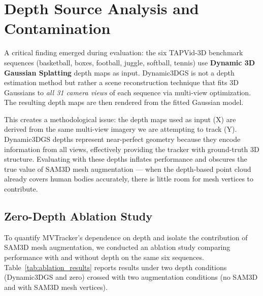 \documentclass[12pt, a4paper, oneside]{report}
\begin{document}
\section{Depth Source Analysis and Contamination}
\label{sec:depth_contamination}

A critical finding emerged during evaluation: the six TAPVid-3D benchmark sequences (basketball, boxes, football, juggle, softball, tennis) use \textbf{Dynamic 3D Gaussian Splatting} \cite{luiten2023dynamic} depth maps as input. Dynamic3DGS is not a depth estimation method but rather a scene reconstruction technique that fits 3D Gaussians to \emph{all 31 camera views} of each sequence via multi-view optimization. The resulting depth maps are then rendered from the fitted Gaussian model.

This creates a methodological issue: the depth maps used as input (X) are derived from the same multi-view imagery we are attempting to track (Y). Dynamic3DGS depths represent near-perfect geometry because they encode information from all views, effectively providing the tracker with ground-truth 3D structure. Evaluating with these depths inflates performance and obscures the true value of SAM3D mesh augmentation --- when the depth-based point cloud already covers human bodies accurately, there is little room for mesh vertices to contribute.

\subsection{Zero-Depth Ablation Study}

To quantify MVTracker's dependence on depth and isolate the contribution of SAM3D mesh augmentation, we conducted an ablation study comparing performance with and without depth on the same six sequences. Table~\ref{tab:ablation_results} reports results under two depth conditions (Dynamic3DGS and zero) crossed with two augmentation conditions (no SAM3D and with SAM3D mesh vertices).
\end{document}
